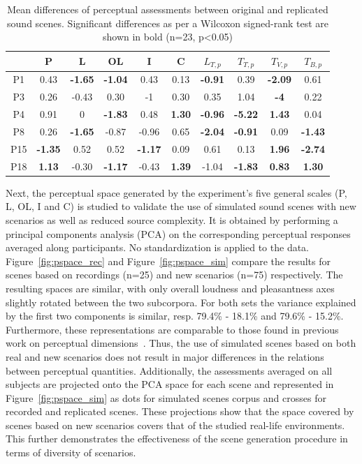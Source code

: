 \documentclass[twocolumn]{article}
\begin{document}
\begin{table}[t]
\centering
\caption{Mean differences of perceptual assessments between original and replicated sound scenes. Significant differences as per a Wilcoxon signed-rank test are shown in bold (n=23, p<0.05)}
\label{tab:ogrep}
\begin{tabular}{ c | c c c c c c c c c }
\hline
	 & P & L & OL & I & C & $L_{T, p}$ & $T_{T, p}$ & $T_{V, p}$ & $T_{B, p}$ \\ \hline
	P1 & 0.43 & \textbf{-1.65} & \textbf{-1.04} & 0.43 & 0.13 & \textbf{-0.91} & 0.39 & \textbf{-2.09} & 0.61 \\
	P3 & 0.26 & -0.43 & 0.30 & -1 & 0.30 & 0.35 & 1.04 & \textbf{-4} & 0.22 \\
	P4 & 0.91 & 0 & \textbf{-1.83} & 0.48 & \textbf{1.30} & \textbf{-0.96} & \textbf{-5.22} & \textbf{1.43} & 0.04 \\
	P8 & 0.26 & \textbf{-1.65} & -0.87 & -0.96 & 0.65 & \textbf{-2.04} & \textbf{-0.91} & 0.09 & \textbf{-1.43} \\
	P15 & \textbf{-1.35} & 0.52 & 0.52 & \textbf{-1.17} & 0.09 & 0.61 & 0.13 & \textbf{1.96} & \textbf{-2.74} \\
	P18 & \textbf{1.13} & -0.30 & \textbf{-1.17} & -0.43 & \textbf{1.39} & -1.04 & \textbf{-1.83} & \textbf{0.83} & \textbf{1.30} \\ \hline
\end{tabular}
\end{table}

Next, the perceptual space generated by the experiment's five general scales (P, L, OL, I and C) is studied to validate the use of simulated sound scenes with new scenarios as well as reduced source complexity. It is obtained by performing a principal components analysis (PCA) on the corresponding perceptual responses averaged along participants. No standardization is applied to the data. Figure~\ref{fig:pspace_rec} and Figure~\ref{fig:pspace_sim} compare the results for scenes based on recordings (n=25) and new scenarios (n=75) respectively. The resulting spaces are similar, with only overall loudness and pleasantness axes slightly rotated between the two subcorpora. For both sets the variance explained by the first two components is similar, resp. 79.4\% - 18.1\% and 79.6\% - 15.2\%. Furthermore, these representations are comparable to those found in previous work on perceptual dimensions~\cite{axelsson2010, cain2013}. Thus, the use of simulated scenes based on both real and new scenarios does not result in major differences in the relations between perceptual quantities. Additionally, the assessments averaged on all subjects are projected onto the PCA space for each scene and represented in Figure~\ref{fig:pspace_sim} as dots for simulated scenes corpus and crosses for recorded and replicated scenes. These projections show that the space covered by scenes based on new scenarios covers that of the studied real-life environments. This further demonstrates the effectiveness of the scene generation procedure in terms of diversity of scenarios.
\end{document}
